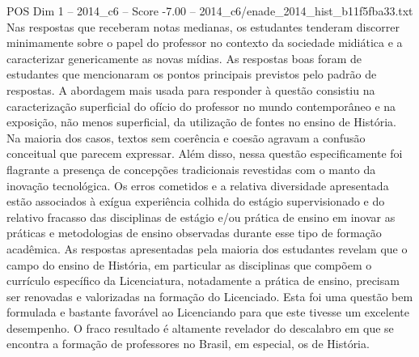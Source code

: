 \begin{textsample}{POS Dim 1 – 2014\_c6 – Score -7.00 – 2014\_c6/enade\_2014\_hist\_b11f5fba33.txt}
Nas respostas que receberam notas medianas, os estudantes tenderam discorrer minimamente sobre o papel do professor no contexto da sociedade midiática e a caracterizar genericamente as novas mídias.
As respostas boas foram de estudantes que mencionaram os pontos principais previstos pelo padrão de respostas.
A abordagem mais usada para responder à questão consistiu na caracterização superficial do ofício do professor no mundo contemporâneo e na exposição, não menos superficial, da utilização de fontes no ensino de História.
Na maioria dos casos, textos sem coerência e coesão agravam a confusão conceitual que parecem expressar.
Além disso, nessa questão especificamente foi flagrante a presença de concepções tradicionais revestidas com o manto da inovação tecnológica.
Os erros cometidos e a relativa diversidade apresentada estão associados à exígua experiência colhida do estágio supervisionado e do relativo fracasso das disciplinas de estágio e/ou prática de ensino em inovar as práticas e metodologias de ensino observadas durante esse tipo de formação acadêmica.
As respostas apresentadas pela maioria dos estudantes revelam que o campo do ensino de História, em particular as disciplinas que compõem o currículo específico da Licenciatura, notadamente a prática de ensino, precisam ser renovadas e valorizadas na formação do Licenciado.
Esta foi uma questão bem formulada e bastante favorável ao Licenciando para que este tivesse um excelente desempenho.
O fraco resultado é altamente revelador do descalabro em que se encontra a formação de professores no Brasil, em especial, os de História.

\end{textsample}

